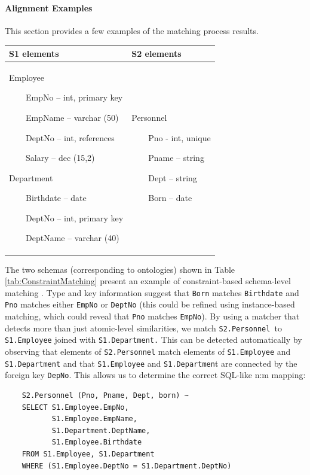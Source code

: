 \paragraph{Alignment Examples}
This section provides a few examples of the matching
process{\textquotesingle} results.
\begin{center}
\label{tab:ConstraintMatching}
\tablehead{}
\begin{supertabular}{|m{0.4\textwidth}|m{0.4\textwidth}|}
\hline
S1 elements &
S2 elements\\\hline
Employee

\ \ \ \ EmpNo -- int, primary key

\ \ \ \ EmpName -- varchar (50)

\ \ \ \ DeptNo -- int, references 

\ \ \ \ Salary -- dec (15,2)

Department

\ \ \ \ Birthdate -- date

\ \ \ \ DeptNo -- int, primary key

\ \ \ \ DeptName -- varchar (40) &
Personnel

\ \ \ \ Pno - int, unique

\ \ \ \ Pname -- string

\ \ \ \ Dept -- string

\ \ \ \ Born -- date\\\hline
\end{supertabular}
\end{center}
The two schemas (corresponding to ontologies) shown in Table \ref{tab:ConstraintMatching} present
an example of constraint-based schema-level matching \cite{rahm01survey}. Type and key information suggest that
\texttt{Born} matches \texttt{Birthdate} and
\texttt{Pno} matches either \texttt{EmpNo} or
\texttt{DeptNo} (this could be refined using
instance-based matching, which could reveal that
\texttt{Pno} matches \texttt{EmpNo}). By
using a matcher that detects more than just atomic-level similarities,
we match \texttt{S2.Personnel }to
\texttt{S1.Employee} joined with
\texttt{S1.Department.} This can be detected automatically
by observing that elements of \texttt{S2.Personnel} match
elements of \texttt{S1.Employee} and
\texttt{S1.Department} and that
\texttt{S1.Employee} and
\texttt{S1.Departmen}t are connected by the foreign key
\texttt{DepNo}. This allows us to determine the correct
SQL-like n:m mapping:
\begin{verbatim}
    S2.Personnel (Pno, Pname, Dept, born) ~
    SELECT S1.Employee.EmpNo,
           S1.Employee.EmpName,
           S1.Department.DeptName,
           S1.Employee.Birthdate
    FROM S1.Employee, S1.Department
    WHERE (S1.Employee.DeptNo = S1.Department.DeptNo)
\end{verbatim}


